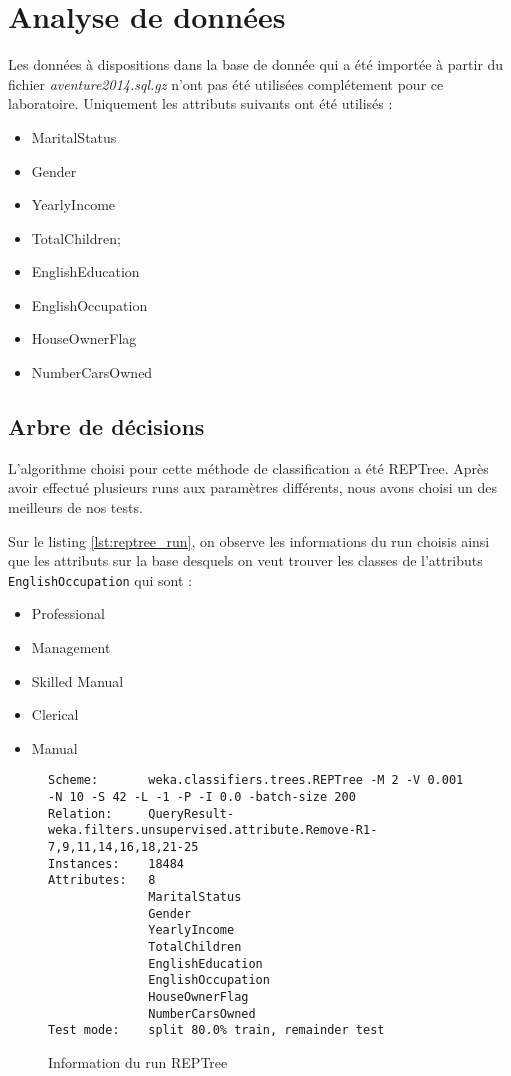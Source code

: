 \chapter{Analyse de données}

Les données à dispositions dans la base de donnée qui a été importée à partir du fichier \textit{aventure2014.sql.gz} n'ont pas été utilisées complétement pour ce laboratoire. Uniquement les attributs suivants ont été utilisés :

\begin{itemize}
	\item MaritalStatus
	\item Gender
	\item YearlyIncome
	\item TotalChildren;
	\item EnglishEducation
	\item EnglishOccupation
	\item HouseOwnerFlag
	\item NumberCarsOwned
\end{itemize}


\section{Arbre de décisions}

L'algorithme choisi pour cette méthode de classification a été REPTree. Après avoir effectué plusieurs runs aux paramètres différents, nous avons choisi un des meilleurs de nos tests.

Sur le listing \autoref{lst:reptree_run}, on observe les informations du run choisis ainsi que les attributs sur la base desquels on veut trouver les classes de l'attributs \texttt{EnglishOccupation} qui sont :

\begin{itemize}
	\item Professional
	\item Management
	\item Skilled Manual
	\item Clerical
	\item Manual
\end{itemize}

\begin{figure}[H]
\centering
\begin{lstlisting}	
Scheme:       weka.classifiers.trees.REPTree -M 2 -V 0.001 -N 10 -S 42 -L -1 -P -I 0.0 -batch-size 200
Relation:     QueryResult-weka.filters.unsupervised.attribute.Remove-R1-7,9,11,14,16,18,21-25
Instances:    18484
Attributes:   8
              MaritalStatus
              Gender
              YearlyIncome
              TotalChildren
              EnglishEducation
              EnglishOccupation
              HouseOwnerFlag
              NumberCarsOwned
Test mode:    split 80.0% train, remainder test
\end{lstlisting}
\caption{Information du run REPTree}
\label{lst:reptree_run}
\end{figure}

